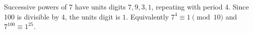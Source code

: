 Successive powers of 7 have units digits $7,9,3,1$, repeating with period 4. Since 100 is divisible by 4, the units digit is $\boxed1$. Equivalently $7^4\equiv1\pmod{10}$ and $7^{100}\equiv1^{25}$.
